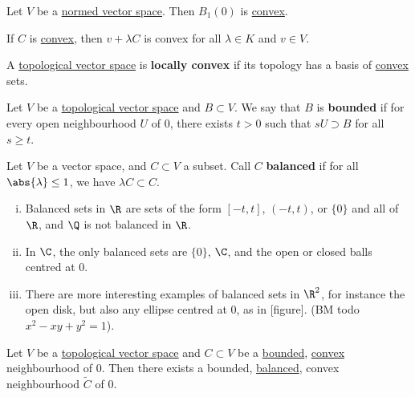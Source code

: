 \documentclass{article}
\begin{document}
\begin{fact}
    Let $V$ be a \hyperlink{def:normed-vector-space}{normed vector space}. Then $B_1(0)$ is \hyperlink{def:convex-subset}{convex}.
\end{fact}

\begin{fact}
    If $C$ is \hyperlink{def:convex-subset}{convex}, then $v + \lambda C$ is convex for all $\lambda \in K$ and $v \in V$.
\end{fact}

\begin{defi}
    A \hyperlink{def:topological-vector-space}{topological vector space} is \textbf{locally convex} if its topology has a basis of \hyperlink{def:convex-subset}{convex} sets.
\end{defi}

\begin{defi}
    Let $V$ be a \hyperlink{def:topological-vector-space}{topological vector space} and $B \subset V$. We say that $B$ is \textbf{bounded} if for every open neighbourhood $U$ of $0$, there exists $t > 0$ such that $s U \supset B$ for all $s \geq t$.
\end{defi}

\begin{defi}
    Let $V$ be a vector space, and $C \subset V$ a subset. Call $C$ \textbf{balanced} if for all $\abs{\lambda} \leq 1$, we have $\lambda C \subset C$.
\end{defi}

\begin{eg}
    \leavevmode
    \begin{enumerate}[(i)]
        \item Balanced sets in $\R$ are sets of the form $[-t, t]$, $(-t, t)$, or $\{0\}$ and all of $\R$, and $\Q$ is not balanced in $\R$.
        \item In $\C$, the only balanced sets are $\{0\}$, $\C$, and the open or closed balls centred at $0$.
        \item There are more interesting examples of balanced sets in $\R^2$, for instance the open disk, but also any ellipse centred at $0$, as in [figure]. (BM todo $x^2 - xy + y^2 = 1$).
    \end{enumerate}
\end{eg}

\begin{lemma}
    Let $V$ be a \hyperlink{def:topological-vector-space}{topological vector space} and $C \subset V$ be a \hyperlink{def:bounded}{bounded}, \hyperlink{def:convex-subset}{convex} neighbourhood of $0$. Then there exists a bounded, \hyperlink{def:balanced}{balanced}, {convex} neighbourhood $\widetilde C$ of $0$.
\end{lemma}
\end{document}
